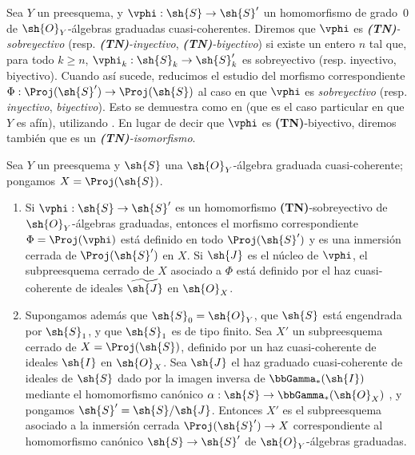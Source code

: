 \documentclass[oneside,10pt]{amsart}
\makeatletter
\renewcommand{\geq}{\geqslant}
\newcommand{\ega@arrow}[2]{\mathchoice{#1}{#2}{#2}{#2}}
\renewcommand{\to}{\ega@arrow{\longrightarrow}{\rightarrow}}
\newcommand{\oldpage}[2][]{\marginnote{\normalfont\footnotesize\textbf{#1}~|~#2}\ignorespaces}
\let\EGAOriginalLabel\label
\renewcommand{\label}[1]{\phantomsection\EGAOriginalLabel{#1}}
\makeatother
\begin{document}
\begin{env}[3.6.1]
\label{II.3.6.1}
Sea $Y$ un preesquema, y $\vphi:\sh{S}\to\sh{S}'$ un homomorfismo de grado~$0$ de $\sh{O}_Y$-álgebras graduadas cuasi-coherentes.
Diremos que $\vphi$ es \emph{\textbf{(TN)}-sobreyectivo} (resp. \emph{\textbf{(TN)}-inyectivo}, \emph{\textbf{(TN)}-biyectivo}) si existe un entero $n$ tal que, para todo $k\geq n$, $\vphi_k:\sh{S}_k\to\sh{S}'_k$ es sobreyectivo (resp. inyectivo, biyectivo).
Cuando así sucede, reducimos el estudio del morfismo correspondiente $\Phi:\Proj(\sh{S}')\to\Proj(\sh{S})$ al caso en que $\vphi$ es \emph{sobreyectivo} (resp. \emph{inyectivo}, \emph{biyectivo}).
Esto se demuestra como en  (que es el caso particular en que $Y$ es afín), utilizando .
En lugar de decir que $\vphi$ es \textbf{(TN)}-biyectivo, diremos también que es un \emph{\textbf{(TN)}-isomorfismo}.
\end{env}

\begin{proposition}[3.6.2]
\label{II.3.6.2}
Sea $Y$ un preesquema y $\sh{S}$ una $\sh{O}_Y$-álgebra graduada cuasi-coherente; pongamos $X=\Proj(\sh{S})$.
\begin{enumerate}
  \item[(i)] Si $\vphi:\sh{S}\to\sh{S}'$ es un homomorfismo \textup{\textbf{(TN)}}-sobreyectivo de $\sh{O}_Y$-álgebras graduadas, entonces el morfismo correspondiente $\Phi=\Proj(\vphi)$  está definido en todo $\Proj(\sh{S}')$ y es una inmersión cerrada de $\Proj(\sh{S}')$ en $X$.
    Si $\sh{J}$ es el núcleo de $\vphi$, el subpreesquema cerrado de $X$ asociado a $\Phi$ está definido por el haz cuasi-coherente de ideales $\widetilde{\sh{J}}$ en $\sh{O}_X$.
  \item[(ii)] Supongamos además que $\sh{S}_0=\sh{O}_Y$, que $\sh{S}$ está engendrada por $\sh{S}_1$, y que $\sh{S}_1$ es de tipo finito.
    Sea $X'$ un subpreesquema cerrado de $X=\Proj(\sh{S})$, definido por un haz cuasi-coherente de ideales $\sh{I}$ en $\sh{O}_X$.
    \oldpage[II]{65}
    Sea $\sh{J}$ el haz graduado cuasi-coherente de ideales de $\sh{S}$ dado por la imagen inversa de $\bbGamma_*(\sh{I})$ mediante el homomorfismo canónico $\alpha:\sh{S}\to\bbGamma_*(\sh{O}_X)$ , y pongamos $\sh{S}'=\sh{S}/\sh{J}$.
    Entonces $X'$ es el subpreesquema asociado  a la inmersión cerrada $\Proj(\sh{S}')\to X$ correspondiente al homomorfismo canónico $\sh{S}\to\sh{S}'$ de $\sh{O}_Y$-álgebras graduadas.
\end{enumerate}
\end{proposition}
\end{document}
